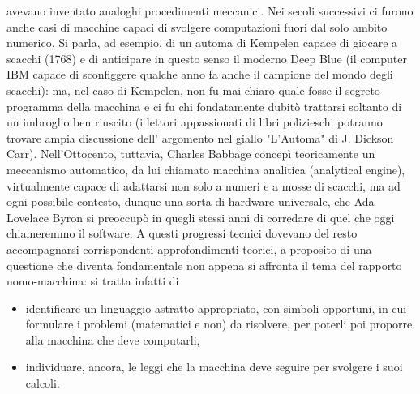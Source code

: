 avevano inventato analoghi procedimenti meccanici. Nei secoli successivi ci furono anche casi di macchine capaci di svolgere computazioni fuori dal solo ambito
numerico. Si parla, ad esempio, di un automa di Kempelen capace di giocare a scacchi (1768) e di anticipare in questo senso il moderno Deep Blue (il computer IBM capace di sconfiggere
qualche anno fa anche il campione del mondo degli scacchi): ma, nel caso di Kempelen, non fu mai chiaro quale fosse il segreto programma della macchina e ci fu chi
fondatamente dubitò trattarsi soltanto di un imbroglio ben riuscito (i lettori appassionati di libri polizieschi potranno trovare ampia discussione dell' argomento
nel giallo "L'Automa" di J. Dickson Carr). Nell'Ottocento, tuttavia, Charles Babbage concepì teoricamente un meccanismo automatico, da lui chiamato macchina analitica (analytical engine),
virtualmente capace di adattarsi non solo a numeri e a mosse di scacchi, ma ad ogni possibile contesto, dunque una sorta di hardware universale, che Ada Lovelace Byron
si preoccupò in quegli stessi anni di corredare di quel che oggi chiameremmo il software.
A questi progressi tecnici dovevano del resto accompagnarsi corrispondenti approfondimenti teorici,
a proposito di una questione che diventa fondamentale non appena si affronta il tema del
rapporto uomo-macchina: si tratta infatti di

\begin{itemize}
    \item identificare un linguaggio astratto appropriato, con simboli opportuni, in cui
          formulare i problemi (matematici e non) da risolvere, per poterli poi proporre
          alla macchina che deve computarli,
    \item individuare, ancora, le leggi che la macchina deve seguire per svolgere i suoi
          calcoli.
\end{itemize}

